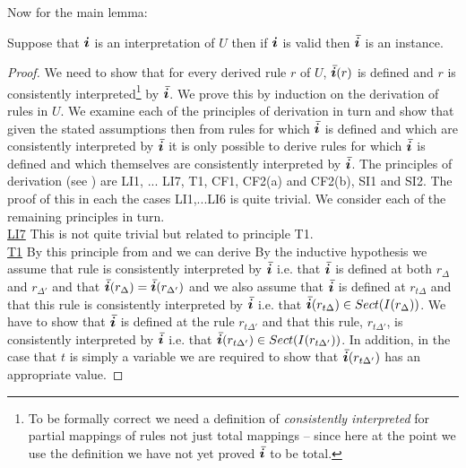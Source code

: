 Now for the main lemma:
\begin{lemma}
Suppose that $\iI$ is an interpretation of $U$  then if $\iI$ is valid  then $\Ibar$ is an instance.
\end{lemma}
\begin{proof} 
\newcommand {\forceSOURCEwidth}{\rule{5cm}{0pt}}  %
\newcommand {\forceTARGETwidth}{\rule{2.2cm}{0pt}}
We need to show that for every derived rule $r$ of $U$, $\Ibar(r)$ is defined and $r$ is consistently interpreted\footnote{To be formally correct we need a definition of \textit{consistently interpreted} for partial mappings of rules not just total mappings -- since here at the point we use the definition we have not yet proved $\Ibar$ to be total.} by $\Ibar$. 
We prove this by induction on the derivation of rules in $U$. We examine each of the principles of derivation in turn
and show that given the stated assumptions then from rules for which $\Ibar$ is defined and which are consistently interpreted by $\Ibar$ 
it is only possible to derive rules for which $\Ibar$ is defined and which themselves are consistently interpreted by $\Ibar$.
The principles of derivation (see \cite{Cartmell86}) are LI1, ... LI7, T1, CF1, CF2(a) and CF2(b), SI1 and SI2. 
The proof of this  in each the cases  LI1,...LI6 is quite trivial. We consider each of the remaining principles in turn. 
 \\
\underline{LI7} This is not quite trivial but related to principle T1.  \\


\underline{T1}
By this principle from  and  we can derive 
By the inductive hypothesis we assume that rule   is consistently interpreted by $\Ibar$ i.e. that
$\Ibar$ is defined at both $r_\Delta$ and $r_{\Delta'}$  and that $\Ibar(r_\Delta) = \Ibar(r_{\Delta'})$
and we also assume that $\Ibar$ is defined at $r_{t\Delta}$ and that this rule
is consistently interpreted by $\Ibar$ i.e. that $\Ibar(r_{t\Delta}) \in Sect(I(r_{\Delta}))$.
We have to show that $\Ibar$ is defined at the rule $r_{t\Delta'}$ and that this rule, $r_{t\Delta'}$, is consistently interpreted 
by $\Ibar$ i.e. that $\Ibar(r_{t\Delta'}) \in Sect(I(r_{t\Delta'}))$. 
In addition, in the case that  $t$ is simply a variable we are required to show  that $\Ibar(r_{t\Delta'})$ has an appropriate value.


\end{proof}
